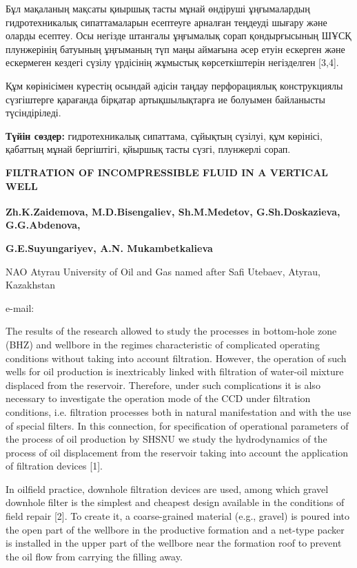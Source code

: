 Бұл мақаланың мақсаты қиыршық тасты мұнай өндіруші ұңғымалардың
гидротехникалық сипаттамаларын есептеуге арналған теңдеуді шығару және
оларды есептеу. Осы негізде штангалы ұңғымалық сорап қондырғысының ШҰСҚ
плунжерінің батуының ұңғыманың түп маңы аймағына әсер етуін ескерген
және ескермеген кездегі сүзілу үрдісінің жұмыстық көрсеткіштерін
негізделген {[}3,4{]}.

Құм көрінісімен күрестің осындай әдісін таңдау перфорациялық
конструкциялы сүзгіштерге қарағанда бірқатар артықшылықтарға ие болуымен
байланысты түсіндіріледі.

{\bfseries Түйін сөздер:} гидротехникалық сипаттама, сұйықтың сүзілуі, құм
көрінісі, қабаттың мұнай бергіштігі, қйыршық тасты сүзгі, плунжерлі
сорап.

{\bfseries FILTRATION OF INCOMPRESSIBLE FLUID IN A VERTICAL WELL}

{\bfseries Zh.K.Zaidemova, M.D.Bisengaliev\textsuperscript{\envelope },
Sh.M.Medetov, G.Sh.Doskazieva, G.G.Abdenova,}

{\bfseries G.E.Suyungariyev, A.N. Mukambetkalieva}

NAO Atyrau University of Oil and Gas named after Safi Utebaev, Atyrau,
Kazakhstan

e-mail:
\href{mailto:maks_bisengali@mail.ru}{}

The results of the research allowed to study the processes in
bottom-hole zone (BHZ) and wellbore in the regimes characteristic of
complicated operating conditions without taking into account filtration.
However, the operation of such wells for oil production is inextricably
linked with filtration of water-oil mixture displaced from the
reservoir. Therefore, under such complications it is also necessary to
investigate the operation mode of the CCD under filtration conditions,
i.e. filtration processes both in natural manifestation and with the use
of special filters. In this connection, for specification of operational
parameters of the process of oil production by SHSNU we study the
hydrodynamics of the process of oil displacement from the reservoir
taking into account the application of filtration devices {[}1{]}.

In oilfield practice, downhole filtration devices are used, among which
gravel downhole filter is the simplest and cheapest design available in
the conditions of field repair {[}2{]}. To create it, a coarse-grained
material (e.g., gravel) is poured into the open part of the wellbore in
the productive formation and a net-type packer is installed in the upper
part of the wellbore near the formation roof to prevent the oil flow
from carrying the filling away.

